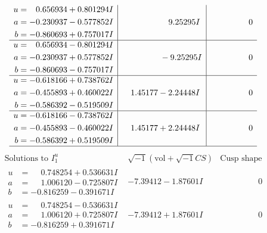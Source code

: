 \documentclass[1p]{elsarticle_modified}
\theoremstyle{definition}
\newcommand{\I}{\sqrt{-1}}
\begin{document}
$$\begin{array}{c|c|c}
\begin{aligned}
u &= \phantom{-}0.656934 + 0.801294 I \\
a &= -0.230937 - 0.577852 I \\
b &= -0.860693 + 0.757017 I\end{aligned}
 & \phantom{-0.000000 -}9.25295 I & \phantom{-0.000000 } 0 \\ \hline\begin{aligned}
u &= \phantom{-}0.656934 - 0.801294 I \\
a &= -0.230937 + 0.577852 I \\
b &= -0.860693 - 0.757017 I\end{aligned}
 & \phantom{-0.000000 } -9.25295 I & \phantom{-0.000000 } 0 \\ \hline\begin{aligned}
u &= -0.618166 + 0.738762 I \\
a &= -0.455893 + 0.460022 I \\
b &= -0.586392 - 0.519509 I\end{aligned}
 & \phantom{-}1.45177 - 2.24448 I & \phantom{-0.000000 } 0 \\ \hline\begin{aligned}
u &= -0.618166 - 0.738762 I \\
a &= -0.455893 - 0.460022 I \\
b &= -0.586392 + 0.519509 I\end{aligned}
 & \phantom{-}1.45177 + 2.24448 I & \phantom{-0.000000 } 0\\
 \hline 
 \end{array}$$\newpage$$\begin{array}{c|c|c}  
\text{Solutions to }I^u_{1}& \I (\text{vol} + \sqrt{-1}CS) & \text{Cusp shape}\\
 \hline 
\begin{aligned}
u &= \phantom{-}0.748254 + 0.536631 I \\
a &= \phantom{-}1.006120 - 0.725807 I \\
b &= -0.816259 - 0.391671 I\end{aligned}
 & -7.39412 - 1.87601 I & \phantom{-0.000000 } 0 \\ \hline\begin{aligned}
u &= \phantom{-}0.748254 - 0.536631 I \\
a &= \phantom{-}1.006120 + 0.725807 I \\
b &= -0.816259 + 0.391671 I\end{aligned}
 & -7.39412 + 1.87601 I & \phantom{-0.000000 } 0 \\ \hline\begin{aligned}

\end{aligned}
\end{array}$$
\end{document}
